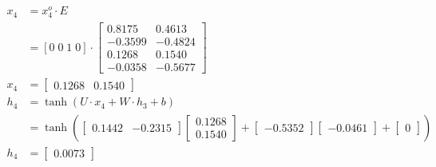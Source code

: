\documentclass{article}
\begin{document}
\begin{align*}
x_4 & = x^o_4 \cdot E \\
    & =  [0 \; 0\; 1\; 0] \cdot \begin{bmatrix}
  0.8175 & 0.4613 \\
 -0.3599 & -0.4824 \\
  0.1268 & 0.1540 \\
 -0.0358 & -0.5677
\end{bmatrix} \\
    x_4 & = \begin{bmatrix}
  0.1268 & 0.1540
\end{bmatrix}\\
h_4 &= \tanh(U \cdot x_4 + W \cdot h_3 + b) \\
&= \tanh\left(\begin{bmatrix}
0.1442 & -0.2315 
\end{bmatrix} \begin{bmatrix}
0.1268 \\ 0.1540
\end{bmatrix} + \begin{bmatrix}
-0.5352
\end{bmatrix} \begin{bmatrix}
-0.0461
\end{bmatrix} + \begin{bmatrix}
0
\end{bmatrix}\right) \\
h_4 &= \begin{bmatrix}
 0.0073
\end{bmatrix}
\end{align*}
\end{document}
